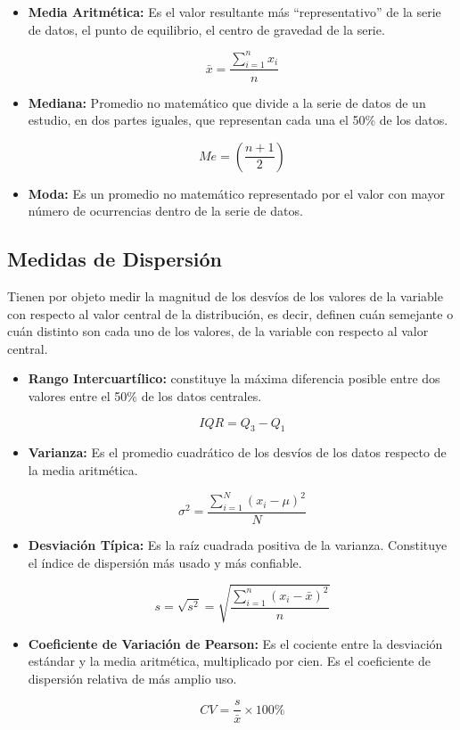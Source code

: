 \documentclass[oneside,11pt]{Latex/Classes/PhDthesisPSnPDF}
\begin{document}
\begin{itemize}
\item{\textbf{Media Aritmética:} Es el valor resultante más “representativo” de la serie de datos, el punto de equilibrio, el centro de gravedad de la serie.}

$$\bar{x} = \frac{\sum_{i=1}^{n} x_i}{n}$$
\item{\textbf{Mediana:} Promedio no matemático que divide a la serie de datos de un estudio, en dos partes iguales, que representan cada una el 50\% de los datos.}

 $$Me = \left(\frac{n+1}{2}\right)$$

\item{\textbf{Moda:} Es un promedio no matemático representado por el valor con mayor número de ocurrencias dentro de la serie de datos.}
\end{itemize}

\hfill\break

\subsection*{Medidas de Dispersión}

Tienen por objeto medir la magnitud de los desvíos de los valores de la
variable con respecto al valor central de la distribución, es decir,
definen cuán semejante o cuán distinto son cada uno de los valores, de
la variable con respecto al valor central.

\begin{itemize}
\item{\textbf{Rango Intercuartílico:} constituye la máxima diferencia posible entre dos valores entre el 50\% de los datos centrales.}

$$IQR = Q_3 - Q_1$$

\item{\textbf{Varianza:} Es el promedio cuadrático de los desvíos de los datos respecto de la media aritmética.}

$$\sigma^2 = \frac{\sum_{i=1}^{N} (x_i - \mu)^2}{N}$$

\item{\textbf{Desviación Típica:} Es la raíz cuadrada positiva de la varianza. Constituye el índice de dispersión más usado y más confiable.}

$$s = \sqrt{s^2} = \sqrt{\frac{\sum_{i=1}^{n} (x_i - \bar{x})^2}{n}}$$

\item{\textbf{Coeficiente de Variación de Pearson:} Es el cociente entre la desviación estándar y la media aritmética, multiplicado por cien. Es el coeficiente de dispersión relativa de más amplio uso.}

$$CV =  \frac{s}{\bar{x}} \times 100\%$$
\end{itemize}
\end{document}
